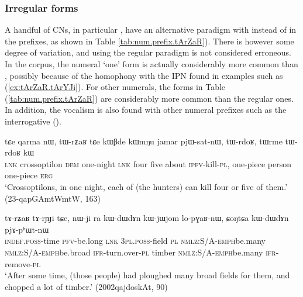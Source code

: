 \subsubsection{Irregular forms} \label{sec:irregular.numeral.prefixes}
A handful of CNs, in particular , have an alternative paradigm with  instead of  in the prefixes, as shown in Table \ref{tab:num.prefix.tArZaR}). There is however some degree of variation, and using the regular paradigm is not considered erroneous. In the corpus, the numeral `one' form  is actually considerably more common than , possibly because of the homophony with the IPN  found in examples such as (\ref{ex:tArZaR.tArYJi}). For other numerals, the forms in Table (\ref{tab:num.prefix.tArZaR}) are considerably more common than the regular ones. In addition, the  vocalism is also found with other numeral prefixes such as the interrogative ().

\begin{exe}
\ex \label{ex:tWrZaR}
\gll tɕe qarma nɯ, tɯ-rʑaʁ tɕe kɯβde kɯmŋu jamar pjɯ-sat-nɯ, tɯ-rdoʁ, tɯrme tɯ-rdoʁ kɯ \\
\textsc{lnk} crossoptilon \textsc{dem} one-night \textsc{lnk} four five about \textsc{ipfv}-kill-\textsc{pl}, one-piece person one-piece \textsc{erg} \\
\glt `Crossoptilons, in one night, each of (the hunters) can kill four or five of them.' (23-qapGAmtWmtW, 163)
\end{exe}

\begin{exe}
\ex \label{ex:tArZaR.tArYJi}
\gll tɤ-rʑaʁ tɤ-rɲɟi tɕe, nɯ-ji ra kɯ-dɯ\redp{}dɤn kɯ-jɯ\redp{}jom lo-pɣaʁ-nɯ, ɕoŋtɕa kɯ-dɯ\redp{}dɤn pjɤ-pʰɯt-nɯ \\
\textsc{indef}.\textsc{poss}-time \textsc{pfv}-be.long \textsc{lnk} \textsc{3pl}.\textsc{poss}-field \textsc{pl} \textsc{nmlz}:S/A-\textsc{emph}\redp{}be.many \textsc{nmlz}:S/A-\textsc{emph}\redp{}be.broad \textsc{ifr}-turn.over-\textsc{pl} timber \textsc{nmlz}:S/A-\textsc{emph}\redp{}be.many \textsc{ifr}-remove-\textsc{pl} \\
\glt `After some time, (those people) had ploughed many broad fields for them, and chopped a lot of timber.' (2002qajdoskAt, 90)
\end{exe}

